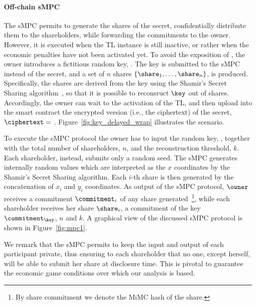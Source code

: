 \medskip

\paragraph*{Off-chain sMPC}\label{sect:impl_mpc_brief}
The sMPC permits to generate the shares of the secret, confidentially distribute them to the shareholders, while forwarding the commitments to the owner.
However, it is executed when the TL instance is still inactive, or rather when the economic penalties have not been activated yet. 
To avoid the exposition of \secret, the owner introduces a fictitious random key, \key.
The key is submitted to the sMPC instead of the secret, and a set of $n$ shares $\left\lbrace \share _1 , \ldots , \share_{n} 	\right\rbrace$, is produced.
Specifically, the shares are derived from the key using the Shamir's Secret Sharing algorithm~\cite{Shamir:1979:SS:359168.359176}, so that it is possible to reconsruct $\key$ out of \KofN shares.
Accordingly, the owner can wait to the activation of the TL, and then upload into the smart contract the encrypted version (i.e., the ciphertext) of the secret, $\ciphertext = $ \wrapsecret. 
Figure~\ref{fig:key_delayed_wrap} illustrates the scenario.

To execute the sMPC protocol the owner has to input the random key, \key, together with the total number of shareholders, $n$, and the reconstruction threshold, $k$. 
Each shareholder, instead, submits only a random seed.
The sMPC generates internally random values which are interpreted as the $x$ coordinates by the Shamir's Secret Sharing algorithm.
Each $i$-th share is then generated by the concatenation of $x_i$ and $y_i$ coordinates.
As output of the sMPC protocol, $\owner$ receives a commitment $\commitment _i$ of any share generated~\footnote{By share commitment we denote the MiMC hash of the share.}, while each shareholder receives her share $\share_{i}$, a commitment of the key $ \commitment _ \key $, $n$ and $k$.
A graphical view of the discussed sMPC protocol is shown in Figure~\ref{fig:mpc1}.

We remark that the sMPC permits to keep the input and output of each participant private, thus ensuring to each shareholder that no one, except herself, will be able to submit her share at disclosure time. 
This is pivotal to guarantee the economic game conditions over which our analysis is based. 

